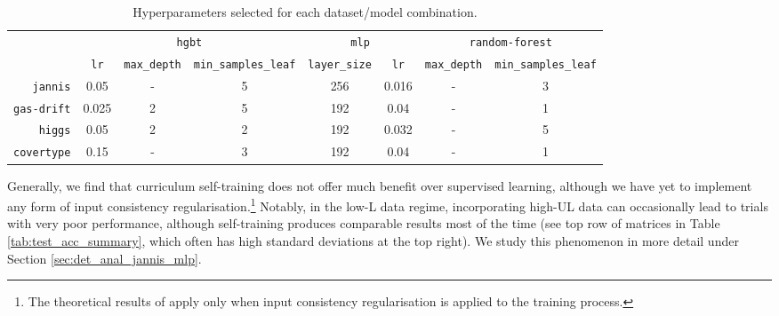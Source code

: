 \documentclass{article}
\begin{document}
\begin{table}[htbp]
  \centering
  \caption{Hyperparameters selected for each dataset/model combination.}
  \label{tab:test_acc_hyperparams}
  \small
  \begin{tabular}{rccccccc}
    \toprule
    & \multicolumn{3}{c}{\normalsize\texttt{hgbt}} & \multicolumn{2}{c}{\normalsize\texttt{mlp}} & \multicolumn{2}{c}{\normalsize\texttt{random-forest}} \\
    \cmidrule(lr){2-4}
    \cmidrule(lr){5-6}
    \cmidrule(lr){7-8}
    & \texttt{lr} & \texttt{max\_depth} & \tiny\texttt{min\_samples\_leaf} & \texttt{layer\_size} & \texttt{lr} & \texttt{max\_depth} & \tiny\texttt{min\_samples\_leaf} \\
    \midrule
    \texttt{jannis} & 0.05 & - & 5 & 256 & 0.016 & - & 3 \\
    \texttt{gas-drift} & 0.025 & 2 & 5 & 192 & 0.04 & - & 1 \\
    \texttt{higgs} & 0.05 & 2 & 2 & 192 & 0.032 & - & 5 \\
    \texttt{covertype} & 0.15 & - & 3 & 192 & 0.04 & - & 1 \\
    \bottomrule
  \end{tabular}
\end{table}

Generally, we find that curriculum self-training does not offer much benefit over
supervised learning, although we have yet to implement any form of input consistency
regularisation.\footnote{%
  The theoretical results of \cite{wei2022theoretical} apply only when input consistency
  regularisation is applied to the training process.
}
Notably, in the low-L data regime, incorporating high-UL data can occasionally lead to
trials with very poor performance, although self-training produces comparable results
most of the time (see top row of matrices in Table \ref{tab:test_acc_summary}, which
often has high standard deviations at the top right).
We study this phenomenon in more detail under Section \ref{sec:det_anal_jannis_mlp}.
\end{document}
